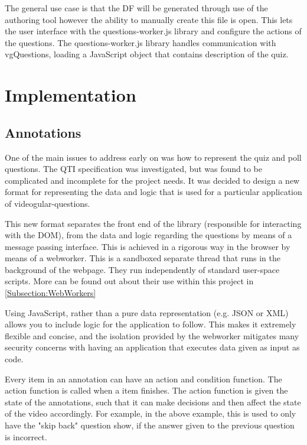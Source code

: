 The general use case is that the \gls{DF} will be generated through use of the authoring tool however the ability to manually create this file is open. This lets the user interface with the questions-worker.js library and configure the actions of the questions. The questions-worker.js library handles communication with vgQuestions, loading a JavaScript object that contains description of the quiz.

\section{Implementation}

\subsection{Annotations}
\label{Section:Annotations}

One of the main issues to address early on was how to represent the quiz and poll questions. The \gls{QTI} specification was investigated, but was found to be complicated and incomplete  for the project needs. It was decided to design a new format for representing the data and logic that is used for a particular application of videogular-questions.

This new format separates the front end of the library (responsible for interacting with the \gls{DOM}), from the data and logic regarding the questions by means of a message passing interface. This is achieved in a rigorous way in the browser by means of a \gls{webworker}. This is a sandboxed separate thread that runs in the background of the webpage. They run independently of standard user-space scripts.  More can be found out about their use within this project in \autoref{Subsection:WebWorkers}

Using JavaScript, rather than a pure data representation (e.g. JSON or XML) allows you to include logic for the application to follow. This makes it extremely flexible and concise, and the isolation provided by the \gls{webworker} mitigates many security concerns with having an application that executes data given as input as code.

Every item in an annotation can have an action and condition function. The action function is called when a item finishes. The action function is given the state of the annotations, such that it can make decisions and then affect the state of the video accordingly. For example, in the above example, this is used to only have the "skip back" question show, if the answer given to the previous question is incorrect.

